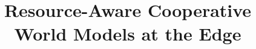 \documentclass[10pt,conference,letterpaper]{IEEEtran}
\begin{document}
\title{Resource-Aware Cooperative World Models at the Edge}

\author{}

\maketitle
\thispagestyle{plain}
\pagestyle{plain}

\begin{abstract}

\end{abstract}












\end{document}

